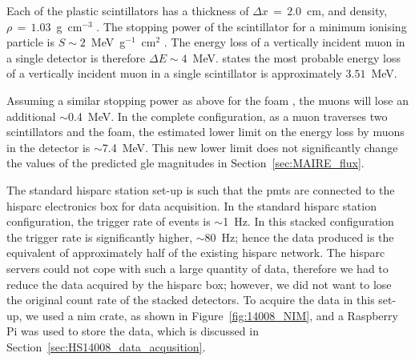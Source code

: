 Each of the plastic scintillators has a thickness of $\Delta x \, = \, 2.0$~cm, and density, $\rho \, = \, 1.03$~g~cm$^{-3}$ \citep{montanus_observability_2017}. The stopping power of the scintillator for a minimum ionising particle is $S \sim 2$~MeV~g$^{-1}$~cm$^{2}$ \citep{fokkema_hisparc_2012, montanus_observability_2017}. The energy loss of a vertically incident muon in a single detector is therefore $\Delta E \sim 4$~MeV. \cite{van_dam_hisparc_2020} states the most probable energy loss of a vertically incident muon in a single scintillator is approximately $3.51$~MeV.

Assuming a similar stopping power as above for the foam \citep{groom_muon_2001, montanus_observability_2017}, the muons will lose an additional $\sim$0.4~MeV. In the complete configuration, as a muon traverses two scintillators and the foam, the estimated lower limit on the energy loss by muons in the detector is $\sim$7.4~MeV. This new lower limit does not significantly change the values of the predicted \gls{gle} magnitudes in Section~\ref{sec:MAIRE_flux}.

The standard \gls{hisparc} station set-up is such that the \glspl{pmt} are connected to the \gls{hisparc} electronics box for data acquisition. In the standard \gls{hisparc} station configuration, the trigger rate of events is $\sim$1~Hz. In this stacked configuration the trigger rate is significantly higher, $\sim$80~Hz; hence the data produced is the equivalent of approximately half of the existing \gls{hisparc} network. The \gls{hisparc} servers could not cope with such a large quantity of data, therefore we had to reduce the data acquired by the \gls{hisparc} box; however, we did not want to lose the original count rate of the stacked detectors. To acquire the data in this set-up, we used a \gls{nim} crate, as shown in Figure~\ref{fig:14008_NIM}, and a Raspberry Pi was used to store the data, which is discussed in Section~\ref{sec:HS14008_data_acqusition}.

